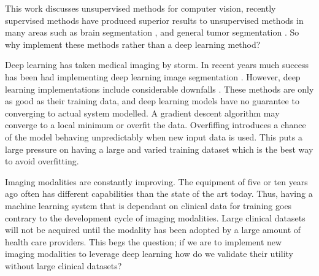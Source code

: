 \documentclass[a4paper,11pt]{article}
\begin{document}
This work discusses unsupervised methods for computer vision, recently supervised methods have produced superior results to unsupervised methods in many areas such as brain segmentation \cite{Bakas2018IdentifyingChallenge}, and general tumor segmentation \cite{MedicalDecathlon}. So why implement these methods rather than a deep learning method?



Deep learning has taken medical imaging by storm. In recent years much success has been had implementing deep learning image segmentation \cite{IsenseeNnU-Net:Segmentation,Ronneberger2015U-Net:Segmentation}. However, deep learning implementations include considerable downfalls \cite{Marcus2018DeepAppraisal}. These methods are only as good as their training data, and deep learning models have no guarantee to converging to actual system modelled. A gradient descent algorithm may converge to a local minimum or overfit the data. Overfiffing introduces a chance of the model behaving unpredictably when new input data is used. This puts a large pressure on having a large and varied training dataset which is the best way to avoid overfitting.

Imaging modalities are constantly improving. The equipment of five or ten years ago often has different capabilities than the state of the art today. Thus, having a machine learning system that is dependant on clinical data for training goes contrary to the development cycle of imaging modalities. Large clinical datasets will not be acquired until the modality has been adopted by a large amount of health care providers. This begs the question; if we are to implement new imaging modalities to leverage deep learning how do we validate their utility without large clinical datasets?
\end{document}
